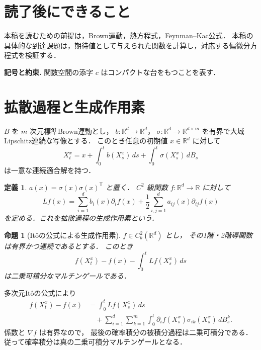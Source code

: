 \documentclass[a5paper,10pt,onecolumn]{jsarticle}
\makeatletter
\theoremstyle{mathnotetheorem}
\newtheorem{definition}[theorem]{定義}
\newtheorem{proposition}[theorem]{命題}
\renewcommand{\proofname}{証明}
\renewenvironment{proof}[1][\proofname]{%
  \par\pushQED{\qed}\normalfont\topsep4\p@\@plus2\p@\relax
  \trivlist\item[\hskip\labelsep\bfseries #1]\ignorespaces
}{\popQED\endtrivlist\@endpefalse}
\makeatother
\begin{document}
\section*{読了後にできること}
本稿を読むための前提は，Brown運動，熱方程式，Feynman--Kac公式．
本稿の具体的な到達課題は，期待値として与えられた関数を計算し，対応する偏微分方程式を検証する．


\par\noindent\textbf{記号と約束.}\quad
関数空間の添字 $c$ はコンパクトな台をもつことを表す．
\par

\section{拡散過程と生成作用素}

$B$ を $m$ 次元標準Brown運動とし，
$b:\mathbb R^d\to\mathbb R^d$，
$\sigma:\mathbb R^d\to\mathbb R^{d\times m}$
を有界で大域Lipschitz連続な写像とする．
このとき任意の初期値 $x\in\mathbb R^d$ に対して
\begin{equation}\label{eq:diffusion}
 X_t^x=x+\int_0^t b(X_s^x)\,ds
       +\int_0^t\sigma(X_s^x)\,dB_s
\end{equation}
は一意な連続適合解を持つ．

\begin{definition}
$a(x)=\sigma(x)\sigma(x)^{\mathsf T}$ と置く．
$C^2$ 級関数 $f:\mathbb R^d\to\mathbb R$ に対して
\[
 Lf(x)=\sum_{i=1}^d b_i(x)\partial_if(x)
 +\frac12\sum_{i,j=1}^d a_{ij}(x)\partial_{ij}f(x)
\]
を定める．これを拡散過程の\emph{生成作用素}という．
\end{definition}

\begin{proposition}[It\^oの公式による生成作用素]\label{prop:generator}
$f\in C_b^2(\mathbb R^d)$ とし，
その1階・2階導関数は有界かつ連続であるとする．
このとき
\[
 f(X_t^x)-f(x)-\int_0^tLf(X_s^x)\,ds
\]
は二乗可積分なマルチンゲールである．
\end{proposition}
\begin{proof}
多次元It\^oの公式により
\begin{align*}
 f(X_t^x)-f(x)
 &=\int_0^t Lf(X_s^x)\,ds\\
 &\quad+\sum_{i=1}^d\sum_{k=1}^m
   \int_0^t\partial_if(X_s^x)\sigma_{ik}(X_s^x)\,dB_s^k.
\end{align*}
係数と $\nabla f$ は有界なので，
最後の確率積分の被積分過程は二乗可積分である．
従って確率積分は真の二乗可積分マルチンゲールとなる．
\end{proof}
\end{document}
